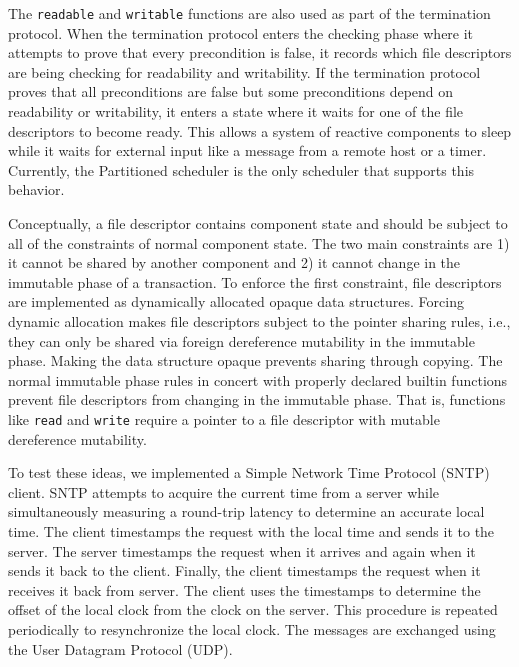 The \verb+readable+ and \verb+writable+ functions are also used as part of the termination protocol.
When the termination protocol enters the checking phase where it attempts to prove that every precondition is false, it records which file descriptors are being checking for readability and writability.
If the termination protocol proves that all preconditions are false but some preconditions depend on readability or writability, it enters a state where it waits for one of the file descriptors to become ready.
This allows a system of reactive components to sleep while it waits for external input like a message from a remote host or a timer.
Currently, the Partitioned scheduler is the only scheduler that supports this behavior.

Conceptually, a file descriptor contains component state and should be subject to all of the constraints of normal component state.
The two main constraints are 1) it cannot be shared by another component and 2) it cannot change in the immutable phase of a transaction.
To enforce the first constraint, file descriptors are implemented as dynamically allocated opaque data structures.
Forcing dynamic allocation makes file descriptors subject to the pointer sharing rules, i.e., they can only be shared via foreign dereference mutability in the immutable phase.
Making the data structure opaque prevents sharing through copying.
The normal immutable phase rules in concert with properly declared builtin functions prevent file descriptors from changing in the immutable phase.
That is, functions like \verb+read+ and \verb+write+ require a pointer to a file descriptor with mutable dereference mutability.

To test these ideas, we implemented a Simple Network Time Protocol (SNTP) client.
SNTP attempts to acquire the current time from a server while simultaneously measuring a round-trip latency to determine an accurate local time.
The client timestamps the request with the local time and sends it to the server.
The server timestamps the request when it arrives and again when it sends it back to the client.
Finally, the client timestamps the request when it receives it back from server.
The client uses the timestamps to determine the offset of the local clock from the clock on the server.
This procedure is repeated periodically to resynchronize the local clock.
The messages are exchanged using the User Datagram Protocol (UDP).

